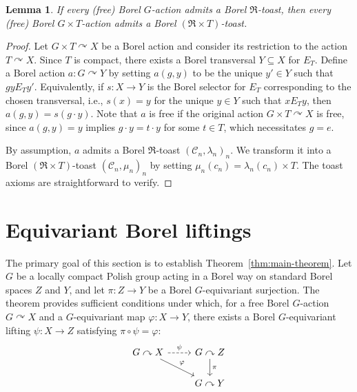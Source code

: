 \documentclass[12pt]{paper}
\numberwithin{equation}{section}
\theoremstyle{plain}
\newtheorem{lemma}[theorem]{Lemma}
\theoremstyle{definition}
\newcommand{\mfR}{\mathfrak{R}}
\newcommand{\acts}{\curvearrowright}
\renewcommand{\phi}{\varphi}
\begin{document}
\begin{lemma}
  \label{lem:toasts-for-direct-products}
  If every (free) Borel \(G\)-action admits a Borel \(\mfR\)-toast, then every (free) Borel
  \( G \times T\)-action admits a Borel \((\mfR \times T)\)-toast.
\end{lemma}
\begin{proof}
  Let \(G \times T \acts X\) be a Borel action and consider its restriction to the action
  \(T \acts X\).  Since \(T\) is compact, there exists a Borel transversal \(Y \subseteq X\) for
  \(E_{T}\).  Define a Borel action \(a : G \acts Y\) by setting \(a(g,y)\) to be the unique
  \(y' \in Y\) such that \(gy E_{T} y'\).  Equivalently, if \(s : X \to Y\) is the Borel selector
  for \(E_{T}\) corresponding to the chosen transversal, i.e., \(s(x) = y\) for the unique
  \(y \in Y\) such that \(x E_{T} y\), then \(a(g,y) = s(g \cdot y)\).  Note that \(a\) is free if
  the original action \(G \times T \acts X\) is free, since \(a(g,y) = y\) implies
  \(g \cdot y = t \cdot y\) for some \(t \in T\), which necessitates \(g = e\).

  By assumption, \(a\) admits a Borel \(\mfR\)-toast \((\mathcal{C}_{n}, \lambda_{n})_{n}\).  We
  transform it into a Borel \((\mfR \times T)\)-toast \((\mathcal{C}_{n}, \mu_{n})_{n}\) by setting
  \(\mu_{n}(c_{n}) = \lambda_{n}(c_{n}) \times T \).  The toast axioms are straightforward to
  verify.
\end{proof}


\section{Equivariant Borel liftings}
\label{sec:equivariant-borel-liftings}

The primary goal of this section is to establish Theorem~\ref{thm:main-theorem}.  Let \(G\) be a
locally compact Polish group acting in a Borel way on standard Borel spaces \(Z\) and \(Y\), and let
\(\pi:Z\to Y\) be a Borel \(G\)-equivariant surjection. The theorem provides sufficient conditions
under which, for a free Borel \(G\)-action \(G\acts X\) and a \(G\)-equivariant map \(\phi:X\to Y\),
there exists a Borel \(G\)-equivariant lifting \(\psi:X\to Z\) satisfying \(\pi\circ \psi=\phi\):
\begin{equation}
  \label{diagram:lift}
  \begin{tikzcd}[ampersand replacement=\&]
    G \acts X \arrow[r, dashed, "\psi"] \arrow[dr, "\phi"]
    \& G \acts Z \arrow[d, "\pi"]\\
    \& G \acts Y
  \end{tikzcd}
\end{equation}
\end{document}
